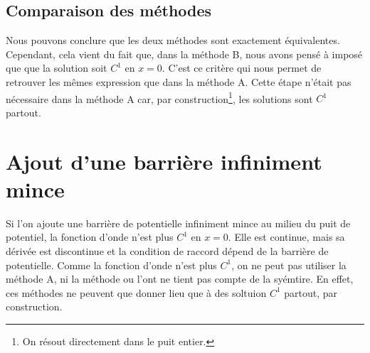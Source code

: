 \documentclass[11pt,a4paper,oneside]{article}
\begin{document}
\subsection{Comparaison des méthodes}

    Nous pouvons conclure que les deux méthodes sont exactement équivalentes. Cependant, cela vient du fait que, dans la méthode B, nous avons pensé à imposé que que la solution soit $C^1$ en $x=0$. C'est ce critère qui nous permet de retrouver les mêmes expression que dans la méthode A. Cette étape n'était pas nécessaire dans la méthode A car, par construction\footnote{On résout directement dans le puit entier.}, les solutions sont $C^1$ partout.

\section{Ajout d'une barrière infiniment mince}

    Si l'on ajoute une barrière de potentielle infiniment mince au milieu du puit de potentiel, la fonction d'onde n'est plus $C^1$ en $x=0$. Elle est continue, mais sa dérivée est discontinue et la condition de raccord dépend de la barrière de potentielle. Comme la fonction d'onde n'est plus $C^1$, on ne peut pas utiliser la méthode A, ni la méthode ou l'ont ne tient pas compte de la syémtire. En effet, ces méthodes ne peuvent que donner lieu que à des soltuion $C^1$ partout, par construction.

\end{document}
